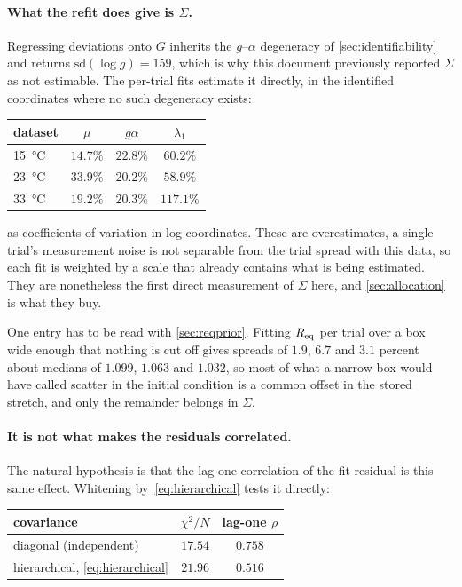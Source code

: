 \documentclass[10pt]{article}
\begin{document}
\paragraph{What the refit does give is $\Sigma$.}
Regressing deviations onto $G$ inherits the $g$--$\alpha$ degeneracy of
\cref{sec:identifiability} and returns $\mathrm{sd}(\log g) = 159$, which is why this document
previously reported $\Sigma$ as not estimable. The per-trial fits estimate it directly, in the
identified coordinates where no such degeneracy exists:

\begin{center}
\begin{tabular}{lccc}
\toprule
dataset & $\mu$ & $g\alpha$ & $\lambda_1$ \\
\midrule
\SI{15}{\celsius} & $14.7\%$ & $22.8\%$ & $60.2\%$ \\
\SI{23}{\celsius} & $33.9\%$ & $20.2\%$ & $58.9\%$ \\
\SI{33}{\celsius} & $19.2\%$ & $20.3\%$ & $117.1\%$ \\
\bottomrule
\end{tabular}
\end{center}

\noindent as coefficients of variation in log coordinates. These are overestimates, a single
trial's measurement noise is not separable from the trial spread with this data, so each fit is
weighted by a scale that already contains what is being estimated. They are nonetheless the
first direct measurement of $\Sigma$ here, and \cref{sec:allocation} is what they buy.

One entry has to be read with \cref{sec:reqprior}. Fitting $R_{\rm eq}$ per trial over a box
wide enough that nothing is cut off gives spreads of $1.9$, $6.7$ and $3.1$ percent about
medians of $1.099$, $1.063$ and $1.032$, so most of what a narrow box would have called
scatter in the initial condition is a common offset in the stored stretch, and only the
remainder belongs in $\Sigma$.

\paragraph{It is not what makes the residuals correlated.}
The natural hypothesis is that the lag-one correlation of the fit residual is this same
effect. Whitening by~\eqref{eq:hierarchical} tests it directly:

\begin{center}
\begin{tabular}{lcc}
\toprule
covariance & $\chi^2/N$ & lag-one $\rho$ \\
\midrule
diagonal (independent) & $17.54$ & $0.758$ \\
hierarchical, \eqref{eq:hierarchical} & $21.96$ & $\mathbf{0.516}$ \\
\bottomrule
\end{tabular}
\end{center}
\end{document}
